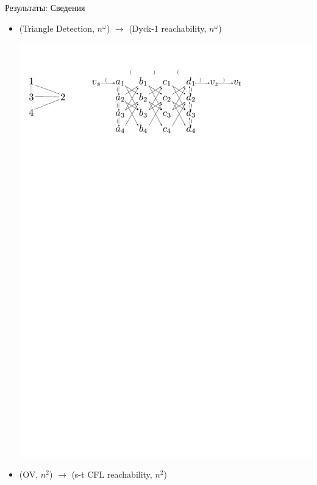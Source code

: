 \documentclass{beamer}
\begin{document}
\begin{frame}{Результаты: Сведения}
	\begin{itemize}
		\item (Triangle Detection, $n^{\omega}$) $\rightarrow$ (Dyck-1 reachability,  $n^{\omega}$)
		
		\begin{center}
			\includegraphics[scale=0.5]{./pictures/triangle_detection_example.pdf}
		\end{center}
		
		\item (OV, $n^{2}$) $\rightarrow$ (s-t CFL reachability,  $n^{2}$)
		

\end{itemize}
\end{frame}
\end{document}
